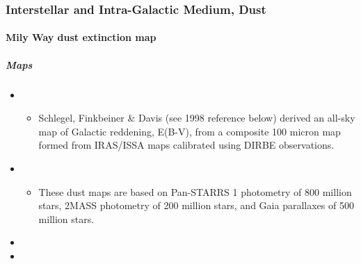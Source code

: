 \documentclass[letterpaper,10pt,english]{sphinxmanual}
\begin{document}
\subsubsection{Interstellar and Intra-Galactic Medium, Dust}
\label{\detokenize{resource/astro/topics/ism_and_dust:interstellar-and-intra-galactic-medium-dust}}\label{\detokenize{resource/astro/topics/ism_and_dust::doc}}

\paragraph{Mily Way dust extinction map}
\label{\detokenize{resource/astro/topics/ism_and_dust:mily-way-dust-extinction-map}}

\subparagraph{Maps}
\label{\detokenize{resource/astro/topics/ism_and_dust:maps}}\begin{itemize}
\item {} 
\begin{itemize}
\item {} 
Schlegel, Finkbeiner \& Davis (see 1998 reference below) derived an
all-sky map of Galactic reddening, E(B-V), from a composite 100
micron map formed from IRAS/ISSA maps calibrated using DIRBE
observations.

\end{itemize}

\item {} 
\begin{itemize}
\item {} 
These dust maps are based on Pan-STARRS 1 photometry of 800
million stars, 2MASS photometry of 200 million stars, and Gaia
parallaxes of 500 million stars.

\end{itemize}

\item {} 

\item {} 

\end{itemize}
\end{document}
